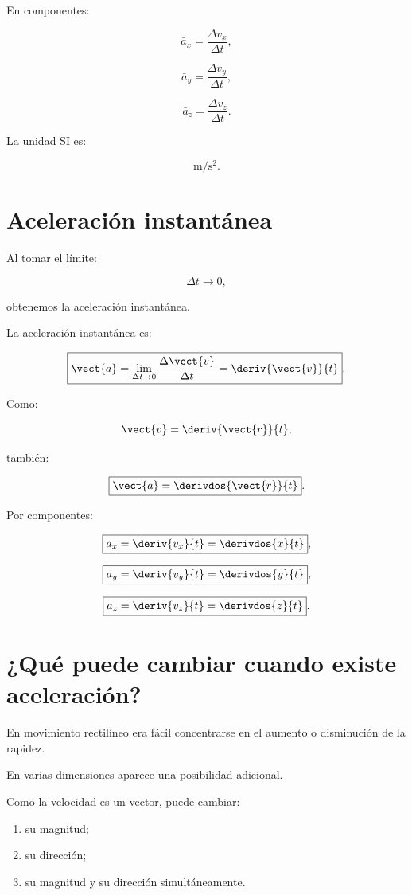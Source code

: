 En componentes:

\[
\bar{a}_x
=
\frac{\Delta v_x}{\Delta t},
\]

\[
\bar{a}_y
=
\frac{\Delta v_y}{\Delta t},
\]

\[
\bar{a}_z
=
\frac{\Delta v_z}{\Delta t}.
\]

La unidad SI es:

\[
\si{\meter\per\second\squared}.
\]


\section{Aceleración instantánea}

Al tomar el límite:

\[
\Delta t\to0,
\]

obtenemos la aceleración instantánea.

\begin{definicion}
La aceleración instantánea es:

\[
\boxed{
\vect{a}
=
\lim_{\Delta t\to0}
\frac{\Delta\vect{v}}{\Delta t}
=
\deriv{\vect{v}}{t}
}.
\]
\end{definicion}

Como:

\[
\vect{v}
=
\deriv{\vect{r}}{t},
\]

también:

\[
\boxed{
\vect{a}
=
\derivdos{\vect{r}}{t}
}.
\]

Por componentes:

\[
\boxed{
a_x=\deriv{v_x}{t}
=
\derivdos{x}{t}
},
\]

\[
\boxed{
a_y=\deriv{v_y}{t}
=
\derivdos{y}{t}
},
\]

\[
\boxed{
a_z=\deriv{v_z}{t}
=
\derivdos{z}{t}
}.
\]


\section{¿Qué puede cambiar cuando existe aceleración?}

En movimiento rectilíneo era fácil concentrarse en el aumento o disminución de
la rapidez.

En varias dimensiones aparece una posibilidad adicional.

Como la velocidad es un vector, puede cambiar:

\begin{enumerate}
    \item su magnitud;
    \item su dirección;
    \item su magnitud y su dirección simultáneamente.
\end{enumerate}

